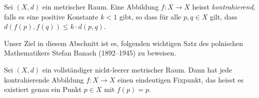 \documentclass[../main.tex]{subfiles}
\begin{document}
\begin{definition}
  Sei $(X, d)$ ein metrischer Raum.
  Eine Abbildung $f \colon X \to X$ heisst \emph{kontrahierend},
  falls es eine positive Konstante $k < 1$ gibt,
  so dass für alle $p, q \in X$ gilt,
  dass $d(f(p), f(q)) \leq k \cdot d(p, q)$.
\end{definition}

Unser Ziel in diesem Abschnitt ist es,
folgenden wichtigen Satz des polnischen
Mathematikers Stefan Banach (1892--1945)
zu beweisen.

\begin{theorem*}
  Sei $(X, d)$ ein vollständiger nicht-leerer metrischer Raum.
  Dann hat jede kontrahierende Abbildung
  $f \colon X \to X$ einen eindeutigen Fixpunkt,
  das heisst es existiert genau ein Punkt $p \in X$
  mit $f(p) = p$.
\end{theorem*}
\end{document}
